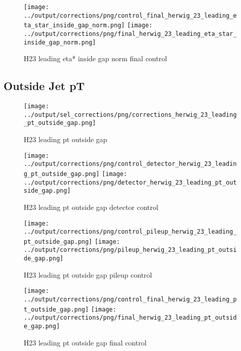 \documentclass[11pt]{book}
\begin{document}
\begin{figure}[ht]
\centering
\texttt{[image: ../output/corrections/png/control\_final\_herwig\_23\_leading\_eta\_star\_inside\_gap\_norm.png]}
\texttt{[image: ../output/corrections/png/final\_herwig\_23\_leading\_eta\_star\_inside\_gap\_norm.png]}
\caption{H23 leading eta* inside gap norm final control}
\label{fig:H23_leading_eta_star_inside_gap_norm_final_control}
\end{figure}

\clearpage
\subsection{Outside Jet pT}

\begin{figure}[ht]
\centering
\texttt{[image: ../output/sel\_corrections/png/corrections\_herwig\_23\_leading\_pt\_outside\_gap.png]}
\caption{H23 leading pt outside gap}
\label{fig:H23_leading_pt_outside_gap}
\end{figure}


\begin{figure}[ht]
\centering
\texttt{[image: ../output/corrections/png/control\_detector\_herwig\_23\_leading\_pt\_outside\_gap.png]}
\texttt{[image: ../output/corrections/png/detector\_herwig\_23\_leading\_pt\_outside\_gap.png]}
\caption{H23 leading pt outside gap detector control}
\label{fig:H23_leading_pt_outside_gap_detector_control}
\end{figure}

\begin{figure}[ht]
\centering
\texttt{[image: ../output/corrections/png/control\_pileup\_herwig\_23\_leading\_pt\_outside\_gap.png]}
\texttt{[image: ../output/corrections/png/pileup\_herwig\_23\_leading\_pt\_outside\_gap.png]}
\caption{H23 leading pt outside gap pileup control}
\label{fig:H23_leading_pt_outside_gap_pileup_control}
\end{figure}


\begin{figure}[ht]
\centering
\texttt{[image: ../output/corrections/png/control\_final\_herwig\_23\_leading\_pt\_outside\_gap.png]}
\texttt{[image: ../output/corrections/png/final\_herwig\_23\_leading\_pt\_outside\_gap.png]}
\caption{H23 leading pt outside gap final control}
\label{fig:H23_leading_pt_outside_gap_final_control}
\end{figure}
\end{document}
